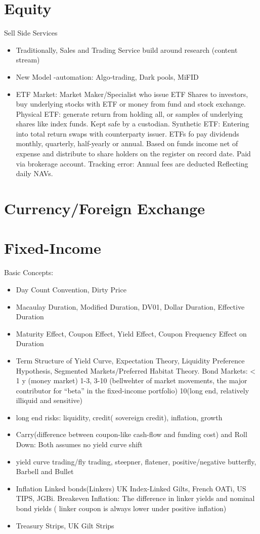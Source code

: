 \documentclass[11pt, openany]{book}              %
\begin{document}
\section{Equity}
Sell Side Services
\begin{itemize}
    \item Traditionally, Sales and Trading Service build around research (content stream)
    \item New Model -automation: Algo-trading, Dark pools, MiFID
    \item ETF Market: Market Maker/Specialist who issue ETF Shares to investors, buy underlying stocks with ETF or money from fund and stock exchange.
    	\subitem Physical ETF: generate return from holding all, or samples of underlying shares like index funds. Kept safe by a custodian.
    	\subitem Synthetic ETF: Entering into total return swaps with counterparty issuer. 
   		\subitem ETFs fo pay dividends monthly, quarterly, half-yearly or annual. Based on funds income net of expense and distribute to share holders on the register on record date. Paid via brokerage account. 
   		\subitem Tracking error: Annual fees are deducted Reflecting daily NAVs. 
\end{itemize}



\section{Currency/Foreign Exchange}
\section{Fixed-Income}
Basic Concepts:
\begin{itemize}
    \item Day Count Convention, Dirty Price
    \item Macaulay Duration, Modified Duration, DV01, Dollar Duration, Effective Duration
    \item Maturity Effect, Coupon Effect, Yield Effect, Coupon Frequency Effect on Duration
    \item Term Structure of Yield Curve, Expectation Theory, Liquidity Preference Hypothesis, Segmented Markets/Preferred Habitat Theory. Bond Markets: < 1 y (money market) 1-3, 3-10 (bellwehter of market movements, the major contributor for “beta” in the fixed-income portfolio) 10(long end, relatively illiquid and sensitive) 
    \item long end risks: liquidity, credit( sovereign credit), inflation, growth
    \item Carry(difference between coupon-like cash-flow and funding cost) and Roll Down: Both assumes no yield curve shift
    \item yield curve trading/fly trading, steepner, flatener, positive/negative butterfly, Barbell and Bullet
    \item Inflation Linked bonds(Linkers) UK Index-Linked Gilts, French OATi, US TIPS, JGBi. Breakeven Inflation: The difference in linker yields and nominal bond yields ( linker coupon is always lower under positive inflation) 
    \item Treasury Strips, UK Gilt Strips 
\end{itemize}
\end{document}
